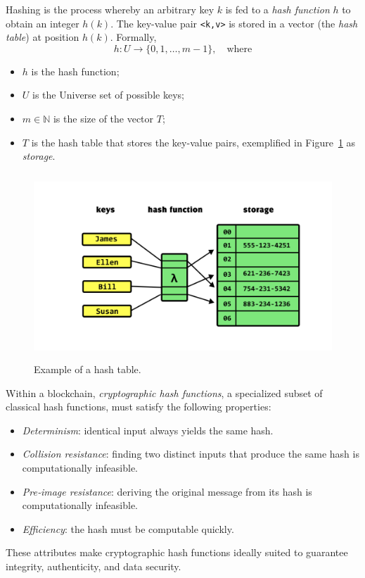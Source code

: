 Hashing is the process whereby an arbitrary key $k$ is fed to a \textit{hash function} $h$ to obtain an integer $h(k)$. The key-value pair \lstinline|<k,v>| is stored in a vector (the \textit{hash table}) at position $h(k)$. Formally,
\begin{equation*}
    h : U \rightarrow \{0,1,\dots,m-1\}, \quad\text{where}
\end{equation*}
\begin{itemize}
    \item $h$ is the hash function;
    \item $U$ is the Universe set of possible keys;
    \item $m \in \mathbb{N}$ is the size of the vector $T$;
    \item $T$ is the hash table that stores the key-value pairs, exemplified in Figure~\ref{hash_table} as \textit{storage}.
\end{itemize}
\begin{figure}[h]
    \centering
    \includegraphics[width=12cm,height=7cm]{Images/Chap1/hash_function.png}
    \caption[Example of a hash table]{Example of a hash table.}
    \label{hash_table}
\end{figure}

Within a blockchain, \textit{cryptographic hash functions}, a specialized subset of classical hash functions, must satisfy the following properties:
\begin{itemize}
    \item \textit{Determinism}: identical input always yields the same hash.
    \item \textit{Collision resistance}: finding two distinct inputs that produce the same hash is computationally infeasible.
    \item \textit{Pre‑image resistance}: deriving the original message from its hash is computationally infeasible.
    \item \textit{Efficiency}: the hash must be computable quickly.
\end{itemize}
These attributes make cryptographic hash functions ideally suited to guarantee integrity, authenticity, and data security.

